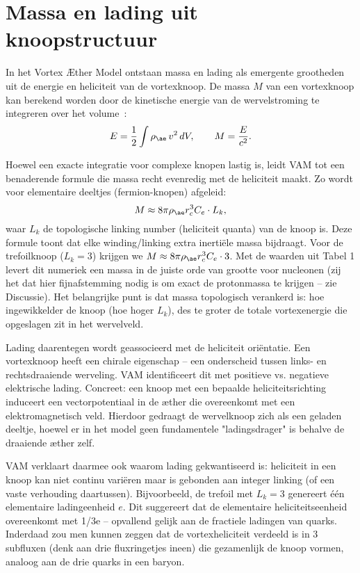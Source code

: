 \section{Massa en lading uit knoopstructuur}

In het Vortex Æther Model ontstaan massa en lading als emergente grootheden uit de energie en heliciteit van de vortexknoop. De massa $M$ van een
vortexknoop kan berekend worden door de kinetische energie van de wervelstroming te integreren over het volume~\cite{Moffatt1990VortexHelicity}:
\begin{equation}
    E = \frac{1}{2}\int \rho_{\ae}\, v^2 \,dV, \qquad M = \frac{E}{c^2}.
\end{equation}

Hoewel een exacte integratie voor complexe knopen lastig is, leidt VAM tot een benaderende formule die massa recht evenredig met de heliciteit maakt. Zo wordt voor elementaire deeltjes (fermion-knopen) afgeleid:
\begin{equation}
    M \approx 8\pi \rho_{\ae} r_c^3 C_e \cdot L_k,
\end{equation}
waar $L_k$ de topologische linking number (heliciteit quanta) van de knoop is. Deze formule toont dat elke winding/linking extra inertiële massa bijdraagt. Voor de trefoilknoop ($L_k=3$) krijgen we $M \approx 8\pi \rho_{\ae} r_c^3 C_e \cdot 3$. Met de waarden uit Tabel 1 levert dit numeriek een massa in de juiste orde van grootte voor nucleonen (zij het dat hier fijnafstemming nodig is om exact de protonmassa te krijgen – zie Discussie). Het belangrijke punt is dat massa topologisch verankerd is: hoe ingewikkelder de knoop (hoe hoger $L_k$), des te groter de totale vortexenergie die opgeslagen zit in het wervelveld.

Lading daarentegen wordt geassocieerd met de heliciteit oriëntatie. Een vortexknoop heeft een chirale eigenschap – een onderscheid tussen links- en rechtsdraaiende werveling. VAM identificeert dit met positieve vs. negatieve elektrische lading. Concreet: een knoop met een bepaalde heliciteitsrichting induceert een vectorpotentiaal in de æther die overeenkomt met een elektromagnetisch veld. Hierdoor gedraagt de wervelknoop zich als een geladen deeltje, hoewel er in het model geen fundamentele "ladingsdrager" is behalve de draaiende æther zelf.

VAM verklaart daarmee ook waarom lading gekwantiseerd is: heliciteit in een knoop kan niet continu variëren maar is gebonden aan integer linking (of een vaste verhouding daartussen). Bijvoorbeeld, de trefoil met $L_k=3$ genereert één elementaire ladingeenheid $e$. Dit suggereert dat de elementaire heliciteitseenheid overeenkomt met 1/3e – opvallend gelijk aan de fractiele ladingen van quarks. Inderdaad zou men kunnen zeggen dat de vortexheliciteit verdeeld is in 3 subfluxen (denk aan drie fluxringetjes ineen) die gezamenlijk de knoop vormen, analoog aan de drie quarks in een baryon.

